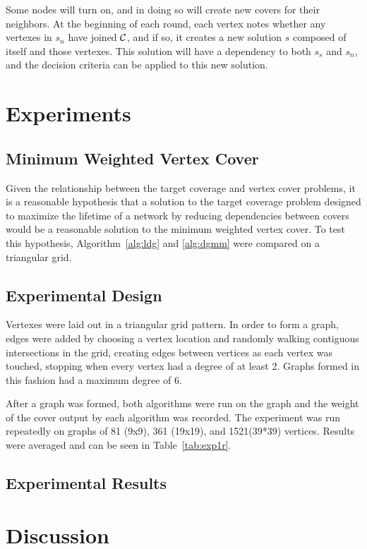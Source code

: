 Some nodes will turn on, and in doing so will create new covers for their neighbors. At the beginning of each round, each vertex notes whether any vertexes in $s_n$ have joined ${\mathcal C}$, and if so, it creates a new solution $s$ composed of itself and those vertexes. This solution will have a dependency to both $s_s$ and $s_n$, and the decision criteria can be applied to this new solution. 
\section{Experiments}
\label{sec:experiment}
\subsection{Minimum Weighted Vertex Cover}
\label{sub:mwvc-exp}
Given the relationship between the target coverage and vertex cover problems, it is a reasonable hypothesis that a solution to the target coverage problem designed to maximize the lifetime of a network by reducing dependencies between covers would be a reasonable solution to the minimum weighted vertex cover. To test this hypothesis, Algorithm~\ref{alg:ldg} and \ref{alg:dgmm} were compared on a triangular grid.
\subsection{Experimental Design}
Vertexes were laid out in a triangular grid pattern. In order to form a graph, edges were added by choosing a vertex location and randomly walking contiguous intersections in the grid, creating edges between vertices  as each vertex was touched, stopping when every vertex had a degree of at least 2. Graphs formed in this fashion had a maximum degree of 6.

After a graph was formed, both algorithms were run on the graph and the weight of the cover output by each algorithm was recorded. The experiment was run repeatedly on graphs of 81 (9x9), 361 (19x19), and 1521(39*39) vertices. Results were averaged and can be seen in Table~\ref{tab:exp1r}.  

\subsection{Experimental Results}


\section{Discussion}
\label{sec:discuss}


